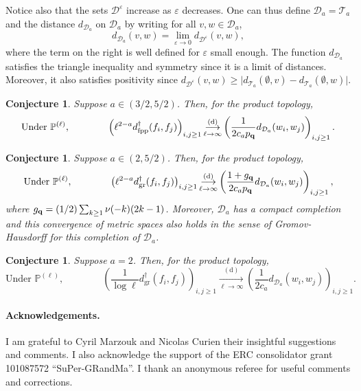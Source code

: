 \documentclass[11pt]{article}
\newtheorem{conjecture}[theorem]{Conjecture}
\numberwithin{equation}{section}
\def\vp{\varepsilon}
\def \T{\mathcal{T}}
\def\P{\mathbb{P}}
\begin{document}
Notice also that the sets $\mathcal{D}^\vp$ increase as $\vp$ decreases. One can thus define $\mathcal{D}_a= \mathcal{T}_a$ and the distance $d_{\mathcal{D}_a}$ on $\mathcal{D}_a$ by writing for all $v,w \in \mathcal{D}_a$,  
$$
d_{\mathcal{D}_a}(v,w) = \lim_{\vp \to 0} d_{\mathcal{D}^\vp}(v,w),
$$
where the term on the right is well defined for $\vp$ small enough. The function $d_{\mathcal{D}_a}$ satisfies the triangle inequality and symmetry since it is a limit of distances. Moreover, it also satisfies positivity since $d_{\mathcal{D}^\vp}(v,w) \ge \vert d_{\T_a} (\emptyset,v)- d_{\T_a} (\emptyset, w) \vert$.

\begin{conjecture}
	Suppose $a \in (3/2,5/2)$. Then, for the product topology,
	$$
	\text{Under } \P^{(\ell)}, \qquad \qquad
	\left(\ell^{2-a}d^\dagger_\mathrm{fpp}(f_i,f_j)\right)_{i,j \ge 1}
	\mathop{\longrightarrow}\limits_{\ell \to \infty}^{(\mathrm{d})}
	\left(\frac{1}{2c_a p_{\bf q}}d_{\mathcal{D}_a} (w_i,w_j)
	\right)_{i,j \ge 1}.
	$$
\end{conjecture}
\begin{conjecture}
	Suppose $a \in (2,5/2)$. Then, for the product topology,
	$$
	\text{Under } \P^{(\ell)}, \qquad \qquad
	\left(\ell^{2-a}d^\dagger_\mathrm{gr}(f_i,f_j)\right)_{i,j \ge 1}
	\mathop{\longrightarrow}\limits_{\ell \to \infty}^{(\mathrm{d})}
	\left(\frac{1+g_{\bf q}}{2c_a p_{\bf q}}d_{\mathcal{D}_a} (w_i,w_j)
	\right)_{i,j \ge 1},
	$$
	where $g_{\bf q} = (1/2) \sum_{k\ge 1} \nu(-k) (2k-1)$. Moreover, $\mathcal{D}_a$ has a compact completion and this convergence of metric spaces also holds in the sense of Gromov-Hausdorff for this completion of $\mathcal{D}_a$.
\end{conjecture}
\begin{conjecture}
	Suppose $a =2$. Then, for the product topology,
	$$
	\text{Under } \P^{(\ell)}, \qquad \qquad
	\left(\frac{1}{\log \ell} d^\dagger_\mathrm{gr}(f_i,f_j)\right)_{i,j \ge 1}
	\mathop{\longrightarrow}\limits_{\ell \to \infty}^{(\mathrm{d})}
	\left(\frac{1}{2c_a}d_{\mathcal{D}_a} (w_i, w_j)
	\right)_{i,j \ge 1}.
	$$
\end{conjecture}

\paragraph{Acknowledgements.} I am grateful to Cyril Marzouk and Nicolas Curien their insightful suggestions and comments. I also acknowledge the support of the ERC consolidator grant 101087572 ``SuPer-GRandMa''. I thank an anonymous referee for useful comments and corrections. 



\end{document}
